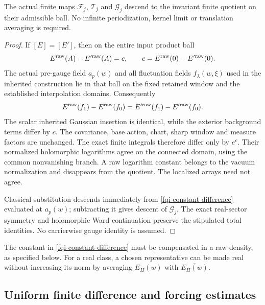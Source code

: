 \begin{lemma}
\label{fqi-descent-lemma}
The actual finite maps $\mathcal F_j$, $\mathcal T_j$ and
$\mathcal G_j$ descend to the invariant finite quotient on
their admissible ball. No infinite periodization, kernel limit
or translation averaging is required.
\end{lemma}
\begin{proof}
If $[E]=[E']$, then on the entire input product ball
\begin{equation}
 E^{\rm raw}(A)-E'^{\rm raw}(A)=c,
 \qquad c=E^{\rm raw}(0)-E'^{\rm raw}(0).
 \label{fqi-constant-difference}
\end{equation}
The actual pre-gauge field $a_p(w)$ and all fluctuation fields
$f_\lambda(w,\xi)$ used in the inherited construction lie in
that ball on the fixed retained window and the established
interpolation domains. Consequently
\begin{equation}
 E^{\rm raw}(f_1)-E^{\rm raw}(f_0)
       =E'^{\rm raw}(f_1)-E'^{\rm raw}(f_0).
 \label{fqi-same-insertion}
\end{equation}
The scalar inherited Gaussian insertion is identical, while
the exterior background terms differ by $c$. The covariance,
base action, chart, sharp window and measure factors are unchanged.
The exact finite integrals therefore differ only by $e^c$.
Their normalized holomorphic logarithms agree on the connected
domain, using the common nonvanishing branch. A raw logarithm
constant belongs to the vacuum normalization and disappears
from the quotient. The localized arrays need not agree.

Classical substitution descends immediately from
\eqref{fqi-constant-difference} evaluated at $a_p(w)$;
subtracting it gives descent of $\mathcal G_j$.
The exact real-sector symmetry and holomorphic Ward continuation
preserve the stipulated total identities. No carrierwise gauge
identity is assumed.
\end{proof}

The constant in \eqref{fqi-constant-difference} must be compensated
in a raw density, as specified below. For a real class, a chosen
representative can be made real without increasing its norm by
averaging $E_H(w)$ with $\overline{E_H(\overline w)}$.

\subsection{Uniform finite difference and forcing estimates}
\label{fqi-estimates-section}

